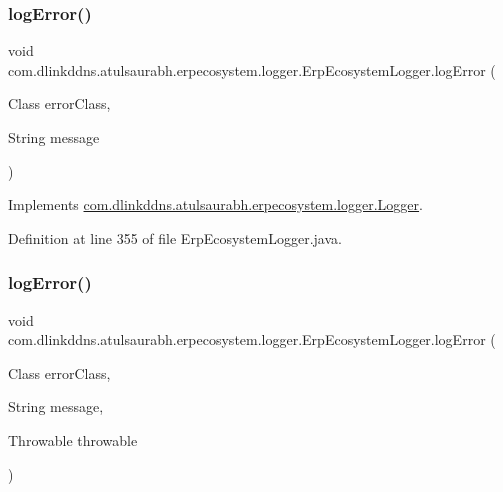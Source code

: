 \subsubsection{\texorpdfstring{log\+Error()}{logError()}\hspace{0.1cm}{\footnotesize\ttfamily [2/3]}}
{\footnotesize\ttfamily void com.\+dlinkddns.\+atulsaurabh.\+erpecosystem.\+logger.\+Erp\+Ecosystem\+Logger.\+log\+Error (\begin{DoxyParamCaption}\item[{Class}]{error\+Class,  }\item[{String}]{message }\end{DoxyParamCaption})}



Implements \mbox{\hyperlink{interfacecom_1_1dlinkddns_1_1atulsaurabh_1_1erpecosystem_1_1logger_1_1_logger_a1cf0d549875c44c1afd8cd01dc0af1d6}{com.\+dlinkddns.\+atulsaurabh.\+erpecosystem.\+logger.\+Logger}}.



Definition at line 355 of file Erp\+Ecosystem\+Logger.\+java.

\mbox{\label{classcom_1_1dlinkddns_1_1atulsaurabh_1_1erpecosystem_1_1logger_1_1_erp_ecosystem_logger_a25316b3eabb66eaecba45d638c420b2b}} 
\subsubsection{\texorpdfstring{log\+Error()}{logError()}\hspace{0.1cm}{\footnotesize\ttfamily [3/3]}}
{\footnotesize\ttfamily void com.\+dlinkddns.\+atulsaurabh.\+erpecosystem.\+logger.\+Erp\+Ecosystem\+Logger.\+log\+Error (\begin{DoxyParamCaption}\item[{Class}]{error\+Class,  }\item[{String}]{message,  }\item[{Throwable}]{throwable }\end{DoxyParamCaption})}



